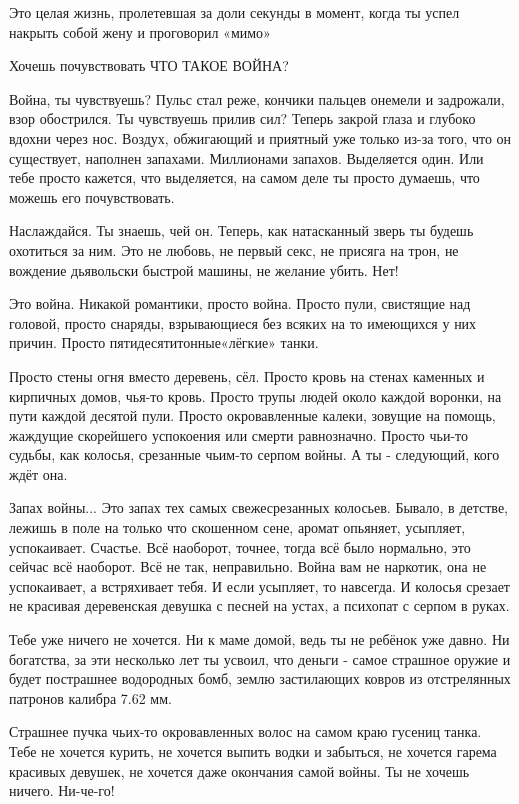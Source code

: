 \documentclass[a4paper,11pt]{extreport}
\begin{document}
Это целая жизнь, пролетевшая за доли секунды в момент, когда ты успел накрыть
собой жену и проговорил «мимо»

Хочешь почувствовать ЧТО ТАКОЕ ВОЙНА?

Война, ты чувствуешь? Пульс стал реже, кончики пальцев онемели и задрожали,
взор обострился. Ты чувствуешь прилив сил? Теперь закрой глаза и глубоко вдохни
через нос. Воздух, обжигающий и приятный уже только из-за того, что он
существует, наполнен запахами. Миллионами запахов. Выделяется один. Или тебе
просто кажется, что выделяется, на самом деле ты просто думаешь, что можешь его
почувствовать.

Наслаждайся. Ты знаешь, чей он. Теперь, как натасканный зверь ты будешь
охотиться за ним. Это не любовь, не первый секс, не присяга на трон, не
вождение дьявольски быстрой машины, не желание убить. Нет!

Это война. Никакой романтики, просто война. Просто пули, свистящие над головой,
просто снаряды, взрывающиеся без всяких на то имеющихся у них причин. Просто
пятидесятитонные«лёгкие» танки.

Просто стены огня вместо деревень, сёл. Просто кровь на стенах каменных и
кирпичных домов, чья-то кровь. Просто трупы людей около каждой воронки, на пути
каждой десятой пули. Просто окровавленные калеки, зовущие на помощь, жаждущие
скорейшего успокоения или смерти равнозначно. Просто чьи-то судьбы, как
колосья, срезанные чьим-то серпом войны. А ты - следующий, кого ждёт она.

Запах войны... Это запах тех самых свежесрезанных колосьев. Бывало, в детстве,
лежишь в поле на только что скошенном сене, аромат опьяняет, усыпляет,
успокаивает. Счастье. Всё наоборот, точнее, тогда всё было нормально, это
сейчас всё наоборот. Всё не так, неправильно. Война вам не наркотик, она не
успокаивает, а встряхивает тебя. И если усыпляет, то навсегда. И колосья
срезает не красивая деревенская девушка с песней на устах, а психопат с серпом
в руках.

Тебе уже ничего не хочется. Ни к маме домой, ведь ты не ребёнок уже давно. Ни
богатства, за эти несколько лет ты усвоил, что деньги - самое страшное оружие и
будет пострашнее водородных бомб, землю застилающих ковров из отстрелянных
патронов калибра 7.62 мм.

Страшнее пучка чьих-то окровавленных волос на самом краю гусениц танка. Тебе не
хочется курить, не хочется выпить водки и забыться, не хочется гарема красивых
девушек, не хочется даже окончания самой войны. Ты не хочешь ничего. Ни-че-го!
\end{document}
